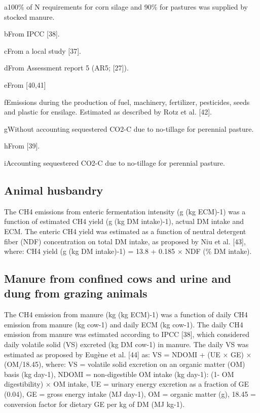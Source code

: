 \documentclass[11pt,a4paper]{article}
\begin{document}
a100\% of N requirements for corn silage and 90\% for pastures was supplied by stocked manure.

bFrom IPCC [38].

cFrom a local study [37].

dFrom Assessment report 5 (AR5; [27]).

eFrom [40,41]

fEmissions during the production of fuel, machinery, fertilizer, pesticides, seeds and plastic for ensilage. Estimated as described by Rotz et al. [42].

gWithout accounting sequestered CO2-C due to no-tillage for perennial pasture.

hFrom [39].

iAccounting sequestered CO2-C due to no-tillage for perennial pasture.

\subsection{Animal husbandry}

The CH4 emissions from enteric fermentation intensity (g (kg ECM)-1) was a function of estimated CH4 yield (g (kg DM intake)-1), actual DM intake and ECM. The enteric CH4 yield was estimated as a function of neutral detergent fiber (NDF) concentration on total DM intake, as proposed by Niu et al. [43], where: CH4 yield (g (kg DM intake)-1) = 13.8 + 0.185 × NDF (\% DM intake).

\subsection{Manure from confined cows and urine and dung from grazing animals}

The CH4 emission from manure (kg (kg ECM)-1) was a function of daily CH4 emission from manure (kg cow-1) and daily ECM (kg cow-1). The daily CH4 emission from manure was estimated according to IPCC [38], which considered daily volatile solid (VS) excreted (kg DM cow-1) in manure. The daily VS was estimated as proposed by Eugène et al. [44] as: VS = NDOMI + (UE × GE) × (OM/18.45), where: VS = volatile solid excretion on an organic matter (OM) basis (kg day-1), NDOMI = non-digestible OM intake (kg day-1): (1- OM digestibility) × OM intake, UE = urinary energy excretion as a fraction of GE (0.04), GE = gross energy intake (MJ day-1), OM = organic matter (g), 18.45 = conversion factor for dietary GE per kg of DM (MJ kg-1).
\end{document}

